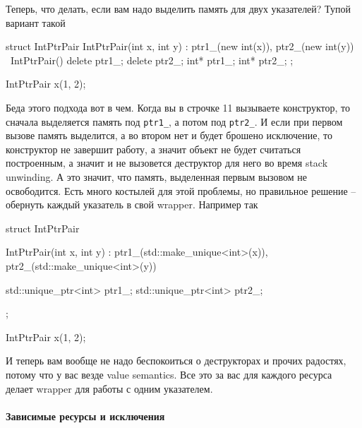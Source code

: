 Теперь, что делать, если вам надо выделить память для двух указателей?
Тупой вариант такой
\begin{cppcode}
struct IntPtrPair {
  IntPtrPair(int x, int y) : ptr1_(new int(x)), ptr2_(new int(y)) {}
  ~IntPtrPair() {
    delete ptr1_;
    delete ptr2_;
  }
  int* ptr1_;
  int* ptr2_;
};

IntPtrPair x(1, 2);
\end{cppcode}
Беда этого подхода вот в чем.
Когда вы в строчке 11 вызываете конструктор, то сначала выделяется память под \verb"ptr1_", а потом под \verb"ptr2_".
И если при первом вызове память выделится, а во втором нет и будет брошено исключение, то конструктор не завершит работу, а значит объект не будет считаться построенным, а значит и не вызовется деструктор для него во время stack unwinding.
А это значит, что память, выделенная первым вызовом не освободится.
Есть много костылей для этой проблемы, но правильное решение -- обернуть каждый указатель в свой wrapper.
Например так
\begin{cppcode}
struct IntPtrPair {
  IntPtrPair(int x, int y) : ptr1_(std::make_unique<int>(x)),
                             ptr2_(std::make_unique<int>(y)) {}

  std::unique_ptr<int> ptr1_;
  std::unique_ptr<int> ptr2_;
};

IntPtrPair x(1, 2);
\end{cppcode}
И теперь вам вообще не надо беспокоиться о деструкторах и прочих радостях, потому что у вас везде value semantics.
Все это за вас для каждого ресурса делает wrapper для работы с одним указателем.

\paragraph{Зависимые ресурсы и исключения}

